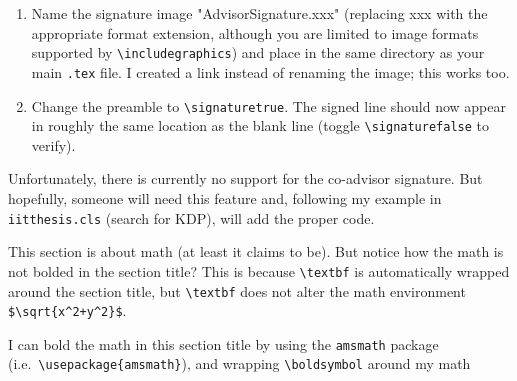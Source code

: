 \documentclass{iitthesis}
\begin{document}
\begin{enumerate}
	\item Name the signature image "AdvisorSignature.xxx" 
	(replacing xxx with the appropriate format extension, 
	although you are limited to image formats supported by \verb|\includegraphics|)
	and place in the same directory as your main {\tt .tex} file.
	I created a link instead of renaming the image; this works too.
	
	\item Change the preamble to \verb|\signaturetrue|.
	The signed line should now appear in roughly the same location 
	as the blank line (toggle \verb|\signaturefalse| to verify).
	
\end{enumerate}
%
Unfortunately, there is currently no support for the co-advisor signature.
But hopefully, someone will need this feature and, 
following my example in {\tt iitthesis.cls} (search for KDP), will add the proper code.




\label{sec:no-bold-in-text}

This section is about math (at least it claims to be).
But notice how the math is not bolded in the section title?
This is because \verb|\textbf| is automatically wrapped around the section title,
but \verb|\textbf| does not alter the math environment \verb|$\sqrt{x^2+y^2}$|.


\label{sec:bold-in-TOC}

I can bold the math in this section title by using the {\tt amsmath} package 
(i.e.\ \verb|\usepackage{amsmath}|), and wrapping {\tt \verb|\boldsymbol|} around my math
\end{document}
